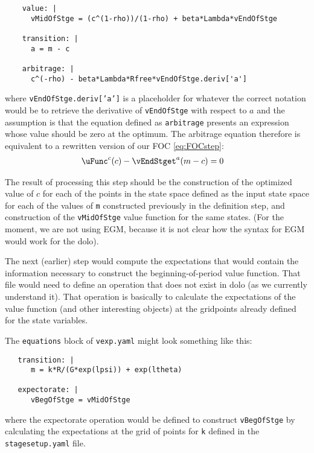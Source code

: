 \documentclass[SolvingMicroDSOPs]{subfiles}
\begin{document}
\begin{verbatim}
    value: |
      vMidOfStge = (c^(1-rho))/(1-rho) + beta*Lambda*vEndOfStge

    transition: |
      a = m - c

    arbitrage: |
      c^(-rho) - beta*Lambda*Rfree*vEndOfStge.deriv['a'] 

\end{verbatim}
where \texttt{vEndOfStge.deriv['a']} is a placeholder for whatever the correct notation would be to retrieve the derivative of \texttt{vEndOfStge} with respect to $a$ and the assumption is that the equation defined as \texttt{arbitrage} presents an expression whose value should be zero at the optimum.  The arbitrage equation therefore is equivalent to a rewritten version of our FOC \eqref{eq:FOCstep}:
\begin{align}
  \uFunc^{{c}}(c) - \vEndStget^{{a}}(m-c) & = 0
\end{align}

The result of processing this step should be the construction of the optimized value of $c$ for each of the points in the state space defined as the input state space for each of the values of \texttt{m} constructed previously in the definition step, and construction of the \texttt{vMidOfStge} value function for the same states. (For the moment, we are not using EGM, because it is not clear how the syntax for EGM would work for the dolo).

The next (earlier) step would compute the expectations that would contain the information necessary to construct the beginning-of-period value function.  That file would need to define an operation that does not exist in dolo (as we currently understand it).  That operation is basically to calculate the expectations of the value function (and other interesting objects) at the gridpoints already defined for the state variables.

The \texttt{equations} block of \texttt{vexp.yaml} might look something like this:
\begin{verbatim}
   transition: |
      m = k*R/(G*exp(lpsi)) + exp(ltheta)

   expectorate: |
      vBegOfStge = vMidOfStge

\end{verbatim}
where the expectorate operation would be defined to construct \texttt{vBegOfStge} by calculating the expectations at the grid of points for \texttt{k} defined in the \texttt{stagesetup.yaml} file.
\end{document}
